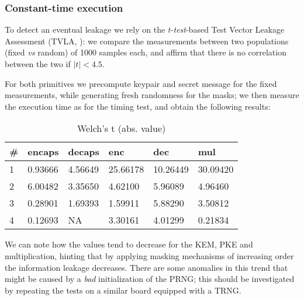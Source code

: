 \newpage

\subsubsection*{Constant-time execution}
To detect an eventual leakage we rely on the \textit{t-test}-based Test Vector Leakage Assessment (TVLA, \cite{schneider2015leakage}): 
we compare the measurements between two populations (fixed \textit{vs} random) of 1000 samples each, and affirm that there is no correlation
between the two if $|t| < 4.5$.

For both primitives we precompute keypair and secret message for the fixed measurements, while generating fresh randomness for the masks; we then measure 
the execution time as for the timing test, and obtain the following results:

\begin{table}[H]
    \begin{tabular}{llllll}
        \# & encaps & decaps & enc & dec & mul \\ \hline
        1 & 0.93666 & 4.56649 & 25.66178 & 10.26449 & 30.09420 \\
        2 & 6.00482 & 3.35650 & 4.62100 & 5.96089 & 4.96460 \\
        3 & 0.28901 & 1.69393 & 1.59911 & 5.88290 & 3.50812 \\
        4 & 0.12693 & NA & 3.30161 & 4.01299 & 0.21834
    \end{tabular}
    \caption{Welch's t (abs. value)}
\end{table}

We can note how the values tend to decrease for the KEM, PKE and multiplication, hinting that
by applying masking mechanisms of increasing order the information leakage decreases. There are some anomalies in this trend
that might be caused by a \textit{bad} initialization of the PRNG; this should be investigated by repeating the tests on a 
similar board equipped with a TRNG.






